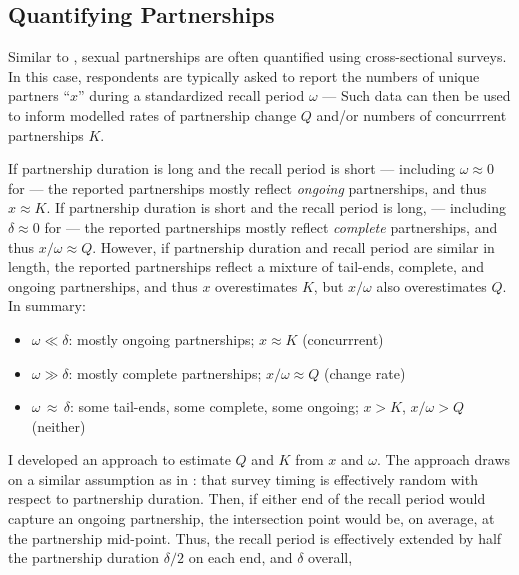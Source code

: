 \subsection{Quantifying Partnerships}\label{app.model.math.qp}
Similar to ,
sexual partnerships are often quantified using cross-sectional surveys.
In this case, respondents are typically asked to report the numbers of unique partners ``$x$''
during a standardized recall period $\omega$ --- \eg
{}
Such data can then be used to inform modelled
rates of partnership change $Q$ and/or numbers of concurrrent partnerships $K$.
\par
If partnership duration is long and the recall period is short
--- including $\omega \approx 0$ for
 ---
the reported partnerships mostly reflect \emph{ongoing} partnerships,
and thus $x \approx K$.
If partnership duration is short and the recall period is long,
--- including $\delta \approx 0$ for
 ---
the reported partnerships mostly reflect \emph{complete} partnerships,
and thus $x/\omega \approx Q$.
However, if partnership duration and recall period are similar in length,
the reported partnerships reflect a mixture of tail-ends, complete, and ongoing partnerships,
and thus $x$ overestimates $K$, but $x/\omega$ also overestimates $Q$.
In summary:
\begin{itemize}
  \item $\omega \ll \delta$: mostly ongoing partnerships;
  $x \approx K$ (concurrrent)
  \item $\omega \gg \delta$: mostly complete partnerships;
  $x/\omega \approx Q$ (change rate)
  \item $\omega\,\approx\,\delta$: some tail-ends, some complete, some ongoing;
  $x > K$, $x/\omega > Q$ (neither)
\end{itemize}
\par
I developed an approach to estimate $Q$ and $K$ from $x$ and $\omega$.
The approach draws on a similar assumption as in :
that survey timing is effectively random with respect to partnership duration.
Then, if either end of the recall period would capture an ongoing partnership,
the intersection point would be, on average, at the partnership mid-point.
Thus, the recall period is effectively extended
by half the partnership duration $\delta/2$ on each end, and $\delta$ overall,
